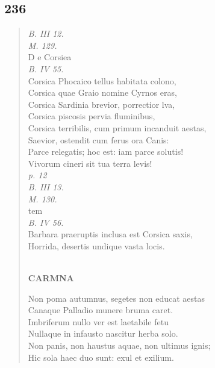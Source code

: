 \documentclass[11pt, a4paper]{report}
\begin{document}
            \subsection*{236}
      \begin{verse}
      \textit{B. III 12.} \\ \textit{M. 129.} \\ D e Corsiea \\ \textit{B. IV 55.} \\ Corsica Phocaico tellus habitata colono, \\ Corsica quae Graio nomine Cyrnos eras, \\ Corsica Sardinia brevior, porrectior lva, \\ Corsica piscosis pervia fluminibus, \\ Corsica terribilis, cum primum incanduit aestas, \\ Saevior, ostendit cum ferus ora Canis: \\ Parce relegatis; hoc est: iam parce solutis! \\ Vivorum cineri sit tua terra levis! \\ \textit{p. 12} \\ \textit{B. III 13.} \\ \textit{M. 130.} \\  \lbrack tem \rbrack  \\ \textit{B. IV 56.} \\ Barbara praeruptis inclusa est Corsica saxis, \\ Horrida, desertis undique vasta locis. \\ 
        ﻿\pagebreak 
     \marginpar{[196]} \begin{center} \textbf{CARMNA} \end{center}Non poma autumnus, segetes non educat aestas \\ Canaque Palladio munere bruma caret. \\ Imbriferum nullo ver est laetabile fetu \\ Nullaque in infausto nascitur herba solo. \\ Non panis, non haustus aquae, non ultimus ignis; \\ Hic sola haec duo sunt: exul et exilium. \\ 
      \end{verse}
  
\end{document}
